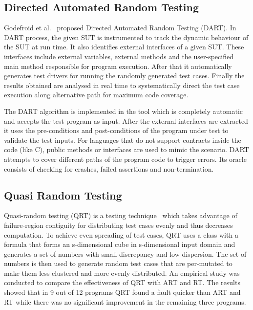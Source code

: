 \subsection{Directed Automated Random Testing}
Godefroid et al.~\cite{godefroid2005dart} proposed Directed Automated Random Testing (DART). %
In DART process, the given SUT is instrumented to track the dynamic behaviour of the SUT at run time. It also identifies external interfaces of a given SUT. These interfaces include external variables, external methods and the user-specified main method responsible for program execution. After that it automatically generates test drivers for running the randomly generated test cases. Finally the results obtained are analysed in real time to systematically direct the test case execution along alternative path for maximum code coverage. 

The DART algorithm is implemented in the tool which is completely automatic and accepts the test program as input. After the external interfaces are extracted it uses the pre-conditions and post-conditions of the program under test to validate the test inputs. For languages that do not support contracts inside the code (like C), public methods or interfaces are used to mimic the scenario. DART attempts to cover different paths of the program code to trigger errors. Its oracle consists of checking for crashes, failed assertions and non-termination.



\subsection{Quasi Random Testing}
Quasi-random testing (QRT) is a testing technique~\cite{chen2007quasi} which takes advantage of failure-region contiguity for distributing test cases evenly and thus decreases computation. %
To achieve even spreading of test cases, QRT uses a class with a formula that forms an s-dimensional cube in s-dimensional input domain and generates a set of numbers with small discrepancy and low dispersion. The set of numbers is then used to generate random test cases that are per-mutated to make them less clustered and more evenly distributed. An empirical study was conducted to compare the effectiveness of QRT with ART and RT. The results showed that in 9 out of 12 programs QRT found a fault quicker than ART and RT while there was no significant improvement in the remaining three programs.

